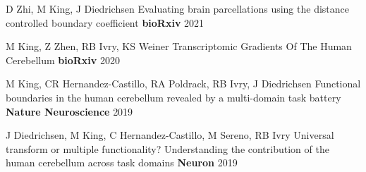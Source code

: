 \begin{cventries}

  \cventry
    {D Zhi, M King, J Diedrichsen} %
    {Evaluating brain parcellations using the distance controlled boundary coefficient} %
    {\textbf{bioRxiv}} %
    {2021} %
    {}

    
  \cventry
    {M King, Z Zhen, RB Ivry, KS Weiner} %
    {Transcriptomic Gradients Of The Human Cerebellum} %
    {\textbf{bioRxiv}} %
    {2020} %
    {}
    
  \cventry
    {M King, CR Hernandez-Castillo, RA Poldrack, RB Ivry, J Diedrichsen} %
    {Functional boundaries in the human cerebellum revealed by a multi-domain task battery} %
    {\textbf{Nature Neuroscience}} %
    {2019} %
    {}
    
  \cventry
    {J Diedrichsen, M King, C Hernandez-Castillo, M Sereno, RB Ivry} %
    {Universal transform or multiple functionality? Understanding the contribution of the human cerebellum across task domains} %
    {\textbf{Neuron}} %
    {2019} %
    {}
    
    
    
    

\end{cventries}
